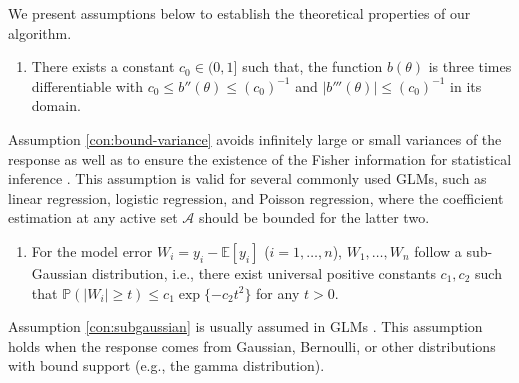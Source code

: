 We present assumptions below to establish the theoretical properties of our algorithm.
\begin{enumerate}[label=(A\arabic*), start=1]
\item There exists a constant $c_0 \in (0, 1]$ such that, the function $b(\theta)$ is three times differentiable with $c_0\leq b''(\theta)\leq (c_0)^{-1}$ and $|b'''(\theta)| \leq (c_0)^{-1}$ in its domain. \label{con:bound-variance}
\end{enumerate}
Assumption \ref{con:bound-variance} avoids infinitely large or small variances of the response \citep{rigollet2012kullback} as well as to ensure the existence of the Fisher information for statistical inference \citep{fan2013tuning}. This assumption is valid for several commonly used GLMs, such as linear regression, logistic regression, and Poisson regression, where the coefficient estimation at any active set $\mathcal{A}$ should be bounded for the latter two.
\begin{enumerate}[label=(A\arabic*), start=2]
\item For the model error $W_i=y_i-\mathbb{E}[y_i]$ ($i = 1, \ldots, n$),
$W_1, \ldots, W_n$ follow a sub-Gaussian distribution, i.e., there exist universal positive constants $c_1,c_2$ such that
$\mathbb{P}(|W_i|\geq t)\leq c_1\exp\{-c_2t^2\}$ for any $t>0$. \label{con:subgaussian}
\end{enumerate}
Assumption \ref{con:subgaussian} is usually assumed in GLMs \citep{sahandnnegahbanUnifiedFrameworkHighDimensional2012}.
This assumption holds when the response comes from Gaussian, Bernoulli, or other distributions with bound support (e.g., the gamma distribution).


